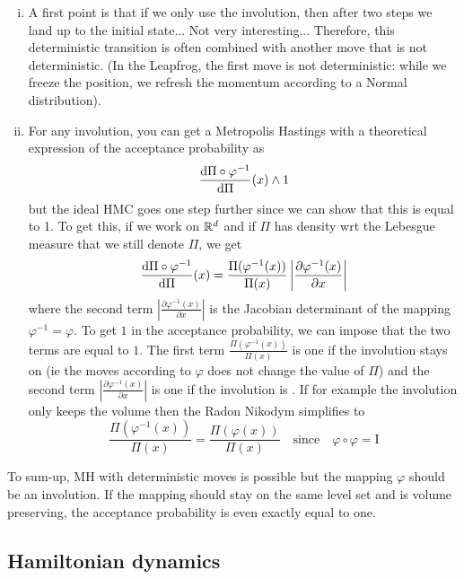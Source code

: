 \documentclass[english,graybox,envcountchap,envcountsame,sectrefs,shortlabels]{svmono}
\theoremstyle{style}
\newcommand{\Id}{\mathrm{I}}
\newcommand{\lrav}[1]{\left|#1 \right|}
\begin{document}
\begin{leftbar}
\begin{remark}
\begin{enumerate}[(i)]
\item A first point is that if we only use the involution, then after two steps we land up to the initial state... Not very interesting... Therefore, this deterministic transition is often combined with another move that is not deterministic. (In the Leapfrog, the first move is not deterministic: while we freeze the position, we refresh the momentum according to a Normal distribution).
\item For any involution, you can get a Metropolis Hastings with a theoretical expression of the acceptance probability as
$$
\frac{\mathrm{d} \Pi\circ \varphi^{-1}}{\mathrm{d} \Pi}(x)  \wedge 1
$$
but the ideal HMC goes one step further since we can show that this is equal to 1. To get this, if we work on $\mathbb{R}^d$ and if $\Pi$ has density wrt the Lebesgue measure that we still denote $\Pi$, we get
$$
\frac{\rmd \Pi\circ \varphi^{-1}}{\rmd \Pi}(x)=\frac{\Pi(\varphi^{-1}(x))}{\Pi(x)} \lrav{\frac{\partial \varphi^{-1}(x)}{\partial x}}
$$
where the second term $\lrav{\frac{\partial \varphi^{-1}(x)}{\partial x}}$ is the Jacobian determinant of the mapping  $\varphi^{-1}=\varphi$. To get $1$ in the acceptance probability, we can impose that the two terms are equal to $1$. The first term $\frac{\Pi(\varphi^{-1}(x))}{\Pi(x)}$ is one if the involution stays on  (ie the moves according to $\varphi$ does not change the value of $\Pi$) and the second term $\lrav{\frac{\partial \varphi^{-1}(x)}{\partial x}}$ is one if the involution is . If for example the involution only keeps the volume then the Radon Nikodym simplifies to
$$
\frac{\Pi(\varphi^{-1}(x))}{\Pi(x)} =\frac{\Pi(\varphi(x))}{\Pi(x)}  \quad \mbox{since} \quad \varphi \circ \varphi=\Id
$$
\end{enumerate}
  
\end{remark}
\end{leftbar}
To sum-up, MH with deterministic moves is possible but the mapping $\varphi$ should be an involution. If the mapping should stay on the same level set and is volume preserving, the acceptance probability is even exactly equal to one.
\subsection{Hamiltonian dynamics}
\end{document}
